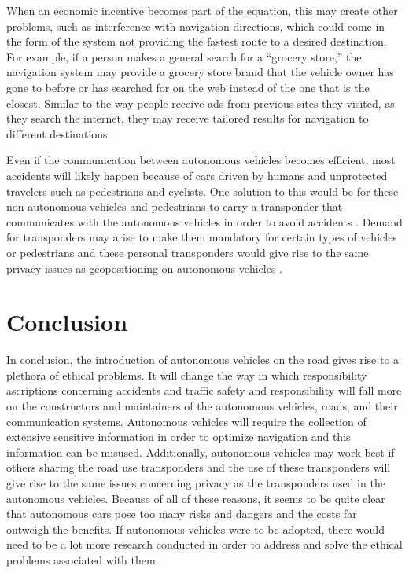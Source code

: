 \documentclass[10pt,twocolumn]{article}
\begin{document}
When an economic incentive becomes part of the equation, this may create other problems, such as interference with navigation directions, which could come in the form of the system not providing the fastest route to a desired destination. For example, if a person makes a general search for a “grocery store,” the navigation system may provide a grocery store brand that the vehicle owner has gone to before or has searched for on the web instead of the one that is the closest. Similar to the way people receive ads from previous sites they visited, as they search the internet, they may receive tailored results for navigation to different destinations.

Even if the communication between autonomous vehicles becomes efficient, most accidents will likely happen because of  cars driven by humans and unprotected travelers such as pedestrians and cyclists. One solution to this would be for these non-autonomous vehicles and pedestrians to carry a transponder that communicates with the autonomous vehicles in order to avoid accidents \cite{EthicalOverview}. Demand for transponders may arise to make them mandatory for certain types of vehicles or pedestrians and these personal transponders would give rise to the same privacy issues as geopositioning on autonomous vehicles \cite{EthicalOverview}.

\section{Conclusion}
In conclusion, the introduction of autonomous vehicles on the road gives rise to a plethora of ethical problems. It will change the way in which responsibility ascriptions concerning accidents and traffic safety and responsibility will fall more on the constructors and maintainers of the autonomous vehicles, roads, and their communication systems. Autonomous vehicles will require the collection of extensive sensitive information in order to optimize navigation and this information can be misused. Additionally, autonomous vehicles may work best if others sharing the road use transponders and the use of these transponders will give rise to the same issues concerning privacy as the transponders used in the autonomous vehicles. Because of all of these reasons, it seems to be quite clear that autonomous cars pose too many risks and dangers and the costs far outweigh the benefits. If autonomous vehicles were to be adopted, there would need to be a lot more research conducted in order to address and solve the ethical problems associated with them. 

\printbibliography 
\end{document}
